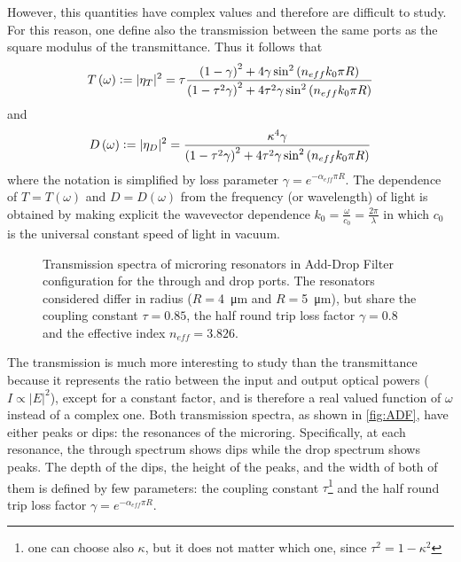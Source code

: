 However, this quantities have complex values and therefore are difficult to study.
For this reason, one define also the transmission between the same ports as the square modulus of the transmittance.
Thus it follows that
\begin{equation}
T \left( \omega \right) \vcentcolon= |\eta_T|^2 = \tau 
\dfrac	{ \left( 1- 				\gamma \right)^2 + 4 				\gamma \sin^2 \left( n_{eff} k_0 \pi R \right) }
			{ \left( 1-\tau^2	\gamma \right)^2 + 4 \tau^2	\gamma \sin^2 \left( n_{eff} k_0 \pi R \right) }
\end{equation}
and
\begin{equation}
D \left( \omega \right) \vcentcolon= |\eta_D|^2 =
\dfrac	{ \kappa^4 \gamma}
			{ \left( 1-\tau^2	\gamma \right)^2 + 4 \tau^2	\gamma \sin^2 \left( n_{eff} k_0 \pi R \right) }
\end{equation}
where the notation is simplified by loss parameter $\gamma = e^{-\alpha_{eff}\pi R}$.
The dependence of $T=T(\omega)$ and $D=D(\omega)$ from the frequency (or wavelength) of light is obtained by making explicit the wavevector dependence $k_0=\frac{\omega}{c_0}=\frac{2\pi}{\lambda}$ in which $c_0$ is the universal constant speed of light in vacuum.

\begin{figure}[!htbp]
	\centering
	
	\caption{
		Transmission spectra of microring resonators in Add-Drop Filter configuration for the through and drop ports.
		The resonators considered differ in radius ($R=$\SI{4}{\um} and $R=$\SI{5}{\um}), but share the coupling constant $\tau=0.85$, the half round trip loss factor $\gamma=0.8$ and the effective index $n_{eff}=3.826$.
	}
	\label{fig:ADF}
\end{figure}

The transmission is much more interesting to study than the transmittance because it represents the ratio between the input and output optical powers ($I\propto |E|^2$), except for a constant factor, and is therefore a real valued function of $\omega$ instead of a complex one.
Both transmission spectra, as shown in \autoref{fig:ADF}, have either peaks or dips: the resonances of the microring.
Specifically, at each resonance, the through spectrum shows dips while the drop spectrum shows peaks.
The depth of the dips, the height of the peaks, and the width of both of them is defined by few parameters: the coupling constant $\tau$\footnote{one can choose also $\kappa$, but it does not matter which one, since $\tau^2 = 1-\kappa^2$} and the half round trip loss factor $\gamma = e^{-\alpha_{eff}\pi R}$.

